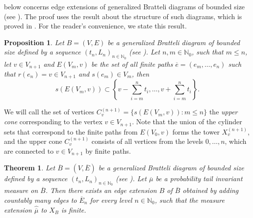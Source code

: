 \documentclass[11pt,reqno]{amsart}
\theoremstyle{definition}
\theoremstyle{remark}
\theoremstyle{plain}
\newtheorem{theorem}[definition]{Theorem}
\newtheorem{prop}[definition]{Proposition}
\def\ol{\overline}
\def\ov{\overline}
\def\wh{\widehat}
\newcommand{\N}{\mathbb N}
\numberwithin{equation}{section}
\begin{document}
 below concerns edge extensions of generalized Bratteli diagrams of bounded size (see ). The proof uses the result about the structure of such diagrams, which is proved in \cite{BezuglyiJorgensenKarpelSanadhya2025}.
For the reader's convenience, we state this result.

\begin{prop}\cite[Corollary 3.6]{BezuglyiJorgensenKarpelSanadhya2025}\label{upper_cone}
Let $B=(V, E)$ be a generalized Bratteli diagram of bounded size defined by a sequence $(t_n, L_n)_{n \in \N_0}$ (see ). 
Let $n,m \in \mathbb{N}_0$, such that $m\leq n$, let $v \in V_{n+1}$ and $E(V_m, v)$ be the set of all finite paths 
$\ov e = (e_m, \ldots, e_{n})$ such that $r(e_n) = v \in V_{n+1}$ and $s(e_m) \in V_m$, then
$$
s(E(V_m, v)) \subset \left\{v - \sum_{i = m}^{n} t_i, \ldots, v + 
\sum_{i = m}^n t_i\right\}.
$$
\end{prop}

We will call the set of vertices $C_v^{(n+1)} = \{s(E(V_m, v)): m \leq n\}$ the \textit{upper cone} corresponding to the vertex $v \in V_{n+1}$. Note that the union of the cylinder sets that correspond to the finite paths from $E(V_0, v)$ forms the tower $X_v^{(n+1)}$, and the upper cone $C_v^{(n+1)}$ consists of all vertices from the levels $0, \ldots, n$, which are connected to $v \in V_{n+1}$ by finite paths.

\begin{theorem}\label{Thm sect 3 adding edges}
Let $\ol B = (V,\ol E)$ be a generalized Bratteli diagram of bounded size defined by a sequence $(t_n, L_n)_{n \in \N_0}$ (see ). Let $\ov \mu$ be a probability tail invariant measure on $\ov B$. Then there exists an edge extension $B$ of $\ol B$ obtained by adding countably many edges to $\ol E_n$ for every level $n \in \N_0$, such that the measure extension $\wh {\ov \mu}$ to $X_B$ is finite. 
\end{theorem} 
\end{document}
